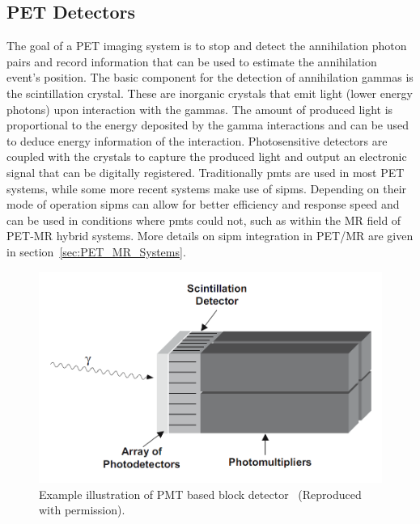 \subsection{PET Detectors}
The goal of a PET imaging system is to stop and detect the annihilation photon pairs and record information that can be used to estimate the annihilation event's position.
The basic component for the detection of annihilation gammas is the scintillation crystal. These are inorganic crystals that emit light (lower energy photons) upon interaction with the gammas. The amount of produced light is proportional to the energy deposited by the gamma interactions and can be used to deduce energy information of the interaction. Photosensitive detectors are coupled with the crystals to capture the produced light and output an electronic signal that can be digitally registered. Traditionally \glspl{pmt} are used in most PET systems, while some more recent systems make use of \glspl{sipm}. Depending on their mode of operation \glspl{sipm} can allow for better efficiency and response speed and can be used in conditions where \glspl{pmt} could not, such as within the MR field of PET-MR hybrid systems. More details on \gls{sipm} integration in PET/MR are given in section~\ref{sec:PET_MR_Systems}.
%
\begin{figure} [ht!]
\centering
\includegraphics[scale=0.78,angle=0]{2_Theory_Methods/figures/block_detector.png}
\caption{Example illustration of PMT based block detector~\cite{Bailey2005} (Reproduced with permission).} 
\label{fig_2:BlockDetectorAndRing}
\end{figure} 
